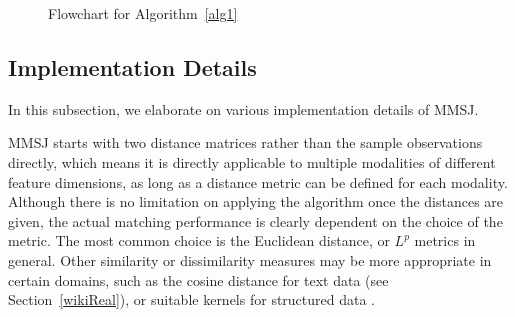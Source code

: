 \documentclass[times,twocolumn,final]{elsarticle}
\begin{document}
\begin{figure}[ht]
\centering
{}
\caption{Flowchart for Algorithm~\ref{alg1}}
\label{flow}
\end{figure}

\subsection{Implementation Details}
\label{discuss}
In this subsection, we elaborate on various implementation details of MMSJ.

MMSJ starts with two distance matrices rather than the sample observations directly, which means it is directly applicable to multiple modalities of different feature dimensions, as long as a distance metric can be defined for each modality. Although there is no limitation on applying the algorithm once the distances are given, the actual matching performance is clearly dependent on the choice of the metric. The most common choice is the Euclidean distance, or $L^{p}$ metrics in general. Other similarity or dissimilarity measures may be more appropriate in certain domains, such as the cosine distance for text data (see Section~\ref{wikiReal}), or suitable kernels for structured data \citep{HofmannEtAl2008}. 
\end{document}
